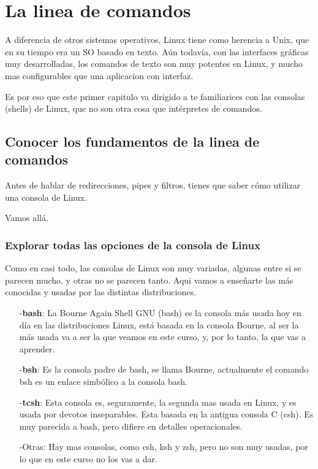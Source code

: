 \chapter{La linea de comandos}
\label{cha:Shell}


A diferencia de otros sistemas operativos, Linux tiene como herencia a Unix,
 que en su tiempo era un SO basado en texto.
Aún todavía, con las interfaces gráficas muy desarrolladas, los comandos de texto
son muy potentes en Linux, y mucho mas configurables que una aplicacion con interfaz.

Es por eso que este primer capitulo va dirigido a te familiarices con las consolas (shells)
de Linux, que no son otra cosa que intérpretes de comandos.


\section*{Conocer los fundamentos de la linea de comandos}

Antes de hablar de redirecciones, pipes y filtros, tienes que saber cómo utilizar una 
consola de Linux.

Vamos allá.

\subsection*{Explorar todas las opciones de la consola de Linux}

Como en casi todo, las consolas de Linux son muy variadas, algunas entre si se parecen mucho, 
y otras no se parecen tanto. Aqui vamos a enseñarte las más conocidas y usadas por las distintas 
distribuciones.


\begin{itemize}

 \item[-\textbf{bash}:]La Bourne Again Shell GNU (bash) es la consola más usada hoy
 en día en las distribuciones Linux, está basada en la consola Bourne,
 al ser la más usada va a ser la que veamos en este curso, y, por lo tanto,
 la que vas a aprender.
 
 \item[-\textbf{bsh}:]Es la consola padre de bash, se llama Bourne, actualmente el comando
 bsh es un enlace simbólico a la consola bash.
 
 \item[-\textbf{tcsh}:]Esta consola es, seguramente, la segunda mas usada en Linux, y es
 usada por devotos inseparables. Esta basada en la antigua consola C (csh).
 Es muy parecida a bash, pero difiere en detalles operacionales. 

 \item[-Otras:]Hay mas consolas, como csh, ksh y zsh, pero no son muy usadas,
 por lo que en este curso no los vas a dar.
 
\end{itemize}




